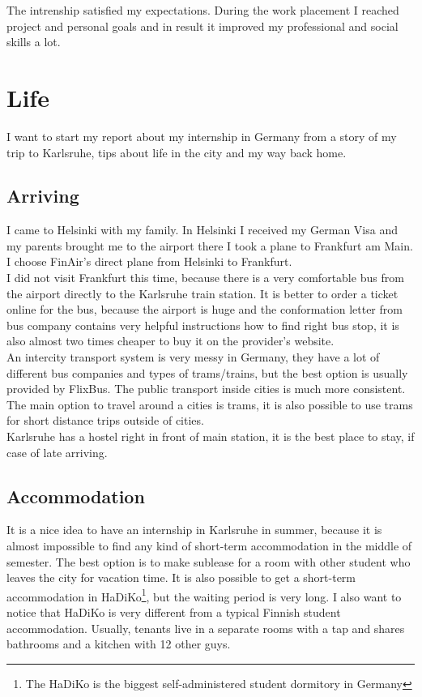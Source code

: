 \documentclass[english]{article}
\begin{document}
The intrenship satisfied my expectations. During the work placement I reached project and personal goals and in result it improved my professional and social skills a lot.


\section{Life}
I want to start my report about my internship in Germany from a story of my trip to Karlsruhe, tips about life in the city and my way back home.

\subsection{Arriving}

I came to Helsinki with my family. In Helsinki I received my German Visa and my parents brought me to the airport there I took a plane to Frankfurt am Main. I choose FinAir's direct plane from Helsinki to Frankfurt.\\

I did not visit Frankfurt this time, because there is a very comfortable bus from the airport directly to the Karlsruhe train station. It is better to order a ticket online for the bus, because the airport is huge and the conformation letter from bus company contains very helpful instructions how to find right bus stop, it is also almost two times cheaper to buy it on the provider's website.\\

An intercity transport system is very messy in Germany, they have a lot of different bus companies and types of trams/trains, but the best option is usually provided by FlixBus. The public transport inside cities is much more consistent. The main option to travel around a cities is trams, it is also possible to use trams for short distance trips outside of cities.\\

Karlsruhe has a hostel right in front of main station, it is the best place to stay, if case of late arriving.

\subsection{Accommodation}

It is a nice idea to have an internship in Karlsruhe in summer, because it is almost impossible to find any kind of short-term accommodation in the middle of semester. The best option is to make sublease for a room with other student who leaves the city for vacation time. It is also possible to get a short-term accommodation in HaDiKo\footnote{The HaDiKo is the biggest self-administered student dormitory in Germany}, but the waiting period is very long. I also want to notice that HaDiKo is very different from a typical Finnish student accommodation. Usually, tenants live in a separate rooms with a tap and shares bathrooms and a kitchen with 12 other guys. \\
\end{document}

